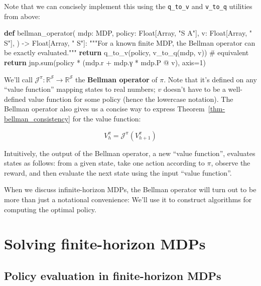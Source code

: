 \documentclass[
  letterpaper,
  DIV=11,
  numbers=noendperiod]{scrreprt}
\newenvironment{Shaded}{\begin{snugshade}}{\end{snugshade}}
\newcommand{\BuiltInTok}[1]{\textcolor[rgb]{0.00,0.23,0.31}{#1}}
\newcommand{\CommentTok}[1]{\textcolor[rgb]{0.37,0.37,0.37}{#1}}
\newcommand{\ControlFlowTok}[1]{\textcolor[rgb]{0.00,0.23,0.31}{\textbf{#1}}}
\newcommand{\DecValTok}[1]{\textcolor[rgb]{0.68,0.00,0.00}{#1}}
\newcommand{\KeywordTok}[1]{\textcolor[rgb]{0.00,0.23,0.31}{\textbf{#1}}}
\newcommand{\NormalTok}[1]{\textcolor[rgb]{0.00,0.23,0.31}{#1}}
\newcommand{\OperatorTok}[1]{\textcolor[rgb]{0.37,0.37,0.37}{#1}}
\newcommand{\StringTok}[1]{\textcolor[rgb]{0.13,0.47,0.30}{#1}}
\theoremstyle{plain}
\theoremstyle{plain}
\theoremstyle{definition}
\theoremstyle{definition}
\theoremstyle{remark}
\begin{document}
Note that we can concisely implement this using the \texttt{q\_to\_v}
and \texttt{v\_to\_q} utilities from above:

\begin{Shaded}
\begin{Highlighting}[]
\KeywordTok{def}\NormalTok{ bellman\_operator(}
\NormalTok{    mdp: MDP,}
\NormalTok{    policy: Float[Array, }\StringTok{"S A"}\NormalTok{],}
\NormalTok{    v: Float[Array, }\StringTok{" S"}\NormalTok{],}
\NormalTok{) }\OperatorTok{{-}\textgreater{}}\NormalTok{ Float[Array, }\StringTok{" S"}\NormalTok{]:}
    \CommentTok{"""For a known finite MDP, the Bellman operator can be exactly evaluated."""}
    \ControlFlowTok{return}\NormalTok{ q\_to\_v(policy, v\_to\_q(mdp, v))  }\CommentTok{\# equivalent}
    \ControlFlowTok{return}\NormalTok{ jnp.}\BuiltInTok{sum}\NormalTok{(policy }\OperatorTok{*}\NormalTok{ (mdp.r }\OperatorTok{+}\NormalTok{ mdp.γ }\OperatorTok{*}\NormalTok{ mdp.P }\OperatorTok{@}\NormalTok{ v), axis}\OperatorTok{=}\DecValTok{1}\NormalTok{)}
\end{Highlighting}
\end{Shaded}

We'll call
\(\mathcal{J}^\pi : \mathbb{R}^{\mathcal{S}} \to \mathbb{R}^{\mathcal{S}}\)
the \textbf{Bellman operator} of \(\pi\). Note that it's defined on any
``value function'' mapping states to real numbers; \(v\) doesn't have to
be a well-defined value function for some policy (hence the lowercase
notation). The Bellman operator also gives us a concise way to express
Theorem~\ref{thm-bellman_consistency} for the value function:

\[V_h^\pi = \mathcal{J}^{\pi}(V_{h+1}^\pi)\]

Intuitively, the output of the Bellman operator, a new ``value
function'', evaluates states as follows: from a given state, take one
action according to \(\pi\), observe the reward, and then evaluate the
next state using the input ``value function''.

When we discuss infinite-horizon MDPs, the Bellman operator will turn
out to be more than just a notational convenience: We'll use it to
construct algorithms for computing the optimal policy.

\section{Solving finite-horizon MDPs}\label{sec-finite_horizon_mdps}

\subsection{Policy evaluation in finite-horizon MDPs}\label{sec-eval_dp}
\end{document}
